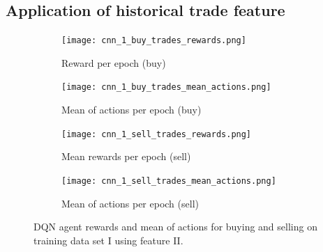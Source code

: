 \subsection{Application of historical trade feature}


\begin{figure}[H]
    \centering
    \begin{subfigure}[b]{0.45\textwidth}
        \texttt{[image: cnn\_1\_buy\_trades\_rewards.png]}
        \caption{Reward per epoch (buy)}
        \label{fig:analysis-dqn-1-trades-reward-buy}
    \end{subfigure}
    \begin{subfigure}[b]{0.45\textwidth}
        \texttt{[image: cnn\_1\_buy\_trades\_mean\_actions.png]}
        \caption{Mean of actions per epoch (buy)}
        \label{fig:analysis-dqn-1-trades-action-buy}
    \end{subfigure}
    \begin{subfigure}[b]{0.45\textwidth}
        \texttt{[image: cnn\_1\_sell\_trades\_rewards.png]}
        \caption{Mean rewards per epoch (sell)}
        \label{fig:analysis-dqn-1-trades-reward-sell}
    \end{subfigure}
    \begin{subfigure}[b]{0.45\textwidth}
        \texttt{[image: cnn\_1\_sell\_trades\_mean\_actions.png]}
        \caption{Mean of actions per epoch (sell)}
        \label{fig:analysis-dqn-1-trades-action-sell}
    \end{subfigure}
    \caption{DQN agent rewards and mean of actions for buying and selling on training data set I using feature II.}
    \label{fig:analysis-dqn-1-trades}
\end{figure}

